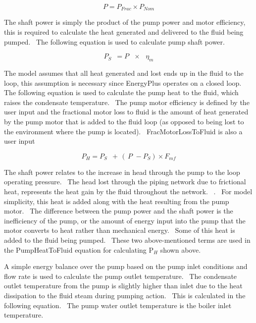 \begin{equation}
P = {P_{Frac}} \times {P_{Nom}}
\end{equation}

The shaft power is simply the product of the pump power and motor efficiency, this is required to calculate the heat generated and delivered to the fluid being pumped.~ The following equation is used to calculate pump shaft power.

\begin{equation}
{P_S}\,\,\, = P\,\,\,\, \times \,\,\,\,{\eta_m}
\end{equation}

The model assumes that all heat generated and lost ends up in the fluid to the loop, this assumption is necessary since EnergyPlus operates on a closed loop.~ The following equation is used to calculate the pump heat to the fluid, which raises the condensate temperature.~ The pump motor efficiency is defined by the user input and the fractional motor loss to fluid is the amount of heat generated by the pump motor that is added to the fluid loop (as opposed to being lost to the environment where the pump is located).~ FracMotorLossToFluid is also a user input

\begin{equation}
{P_H} = {P_S}\,\,\, + \,(\,P\,\, - {P_S}) \times {F_{mf}}
\end{equation}

The shaft power relates to the increase in head through the pump to the loop operating pressure.~ The head lost through the piping network due to frictional heat, represents the heat gain by the fluid throughout the network.~ .~ For model simplicity, this heat is added along with the heat resulting from the pump motor.~ The difference between the pump power and the shaft power is the inefficiency of the pump, or the amount of energy input into the pump that the motor converts to heat rather than mechanical energy.~ Some of this heat is added to the fluid being pumped.~ These two above-mentioned terms are used in the PumpHeatToFluid equation for calculating P\(_{H}\) shown above.

A simple energy balance over the pump based on the pump inlet conditions and flow rate is used to calculate the pump outlet temperature.~ The condensate outlet temperature from the pump is slightly higher than inlet due to the heat dissipation to the fluid steam during pumping action.~ This is calculated in the following equation.~ The pump water outlet temperature is the boiler inlet temperature.

